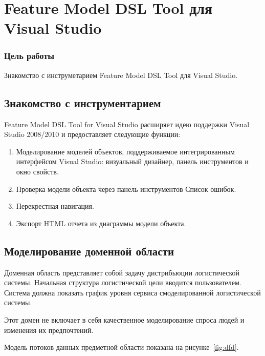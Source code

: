 


\newcommand{\labnumber}{2} %



\graphicspath{{figures/}}


\Ukrainian


\addtocounter{page}{1}

\section*{Feature Model DSL Tool для Visual Studio}
\subsubsection*{Цель работы}
Знакомство с инструметарием Feature Model DSL Tool для Visual Studio.

\subsection{Знакомство с инструментарием}
Feature Model DSL Tool for Visual Studio расширяет идею поддержки Visual Studio 2008/2010 и предоставляет следующие функции:
\begin{enumerate}
    \item Моделирование моделей объектов, поддерживаемое интегрированным интерфейсом Visual Studio: визуальный дизайнер, панель инструментов и окно свойств.
    \item Проверка модели объекта через панель инструментов Список ошибок.
    \item Перекрестная навигация.
    \item Экспорт HTML отчета из диаграммы модели объекта.
\end{enumerate}

\subsection{Моделирование доменной области}
Доменная область представляет собой задачу дистрибьюции логистической системы. 
Начальная структура логистической цели вводится пользователем. 
Система должна показать график уровня сервиса смоделированной логистической системы.

Этот домен не включает в себя качественное моделирование спроса людей и изменения их предпочтений.

Модель потоков данных предметной области показана на рисунке~\ref{fig:dfd}.

